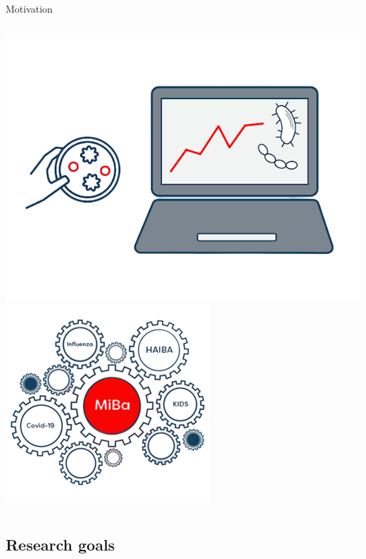\documentclass[aspectratio=169]{beamer}
\begin{document}
\begin{frame}{Motivation}
\begin{columns}
\begin{column}{.38\textwidth}
\includegraphics[width=0.75\linewidth]{../figures/MiBaPetriComp} \includegraphics[width=0.75\linewidth]{../figures/MiBa} 

 \normalsize
\end{column}
\end{columns}
\end{frame}

\hypertarget{research-goals}{%
\subsection{Research goals}\label{research-goals}}
\end{document}
